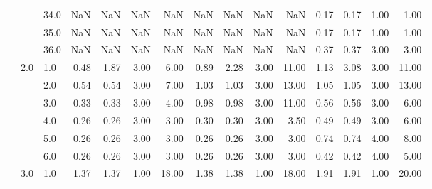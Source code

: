 \begin{tabular}{lllrrrrrrrrrrrr}
       &     & 34.0 &        NaN &       NaN &  NaN &    NaN &        NaN &       NaN &   NaN &    NaN &       0.17 &      0.17 &  1.00 &   1.00 \\
       &     & 35.0 &        NaN &       NaN &  NaN &    NaN &        NaN &       NaN &   NaN &    NaN &       0.17 &      0.17 &  1.00 &   1.00 \\
       &     & 36.0 &        NaN &       NaN &  NaN &    NaN &        NaN &       NaN &   NaN &    NaN &       0.37 &      0.37 &  3.00 &   3.00 \\
       & 2.0 & 1.0  &       0.48 &      1.87 & 3.00 &   6.00 &       0.89 &      2.28 &  3.00 &  11.00 &       1.13 &      3.08 &  3.00 &  11.00 \\
       &     & 2.0  &       0.54 &      0.54 & 3.00 &   7.00 &       1.03 &      1.03 &  3.00 &  13.00 &       1.05 &      1.05 &  3.00 &  13.00 \\
       &     & 3.0  &       0.33 &      0.33 & 3.00 &   4.00 &       0.98 &      0.98 &  3.00 &  11.00 &       0.56 &      0.56 &  3.00 &   6.00 \\
       &     & 4.0  &       0.26 &      0.26 & 3.00 &   3.00 &       0.30 &      0.30 &  3.00 &   3.50 &       0.49 &      0.49 &  3.00 &   6.00 \\
       &     & 5.0  &       0.26 &      0.26 & 3.00 &   3.00 &       0.26 &      0.26 &  3.00 &   3.00 &       0.74 &      0.74 &  4.00 &   8.00 \\
       &     & 6.0  &       0.26 &      0.26 & 3.00 &   3.00 &       0.26 &      0.26 &  3.00 &   3.00 &       0.42 &      0.42 &  4.00 &   5.00 \\
       & 3.0 & 1.0  &       1.37 &      1.37 & 1.00 &  18.00 &       1.38 &      1.38 &  1.00 &  18.00 &       1.91 &      1.91 &  1.00 &  20.00 \\
\bottomrule
\end{tabular}
